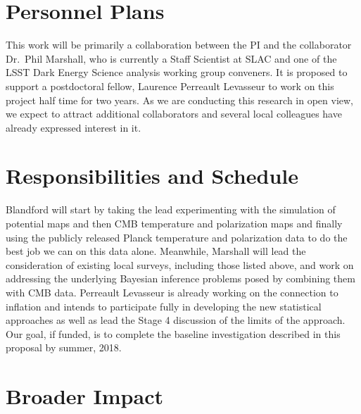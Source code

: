\documentclass[psfig,12pt]{article}
\begin{document}
{\section{Personnel Plans}
\label{sec:personnel}

This work will be primarily a collaboration between the PI and the
collaborator Dr.\ Phil Marshall, who is currently a Staff Scientist at
SLAC and one of the LSST Dark Energy Science analysis working group
conveners. It is proposed to support a postdoctoral fellow, Laurence
Perreault Levasseur to work on this project half time for two years. As
we are conducting this research in open view, we expect to attract
additional collaborators and several local colleagues have already
expressed interest in it.


\section{Responsibilities and Schedule}
\label{sec:schedule}

Blandford will start by taking the lead experimenting with the
simulation of potential maps and then CMB temperature and polarization
maps and finally using the publicly released Planck temperature and
polarization data to do the best job we can on this data alone.
Meanwhile, Marshall will lead the consideration of existing local
surveys, including those listed above, and work on addressing the
underlying Bayesian inference problems posed by combining them with CMB
data.  Perreault Levasseur is already working on the connection to
inflation and intends to participate fully in developing the new
statistical approaches as well as lead the Stage 4 discussion of the
limits of the approach. Our goal, if funded, is to complete the baseline
investigation described in this proposal by summer, 2018.


\section{Broader Impact}
\label{sec:impact}

}
\end{document}
